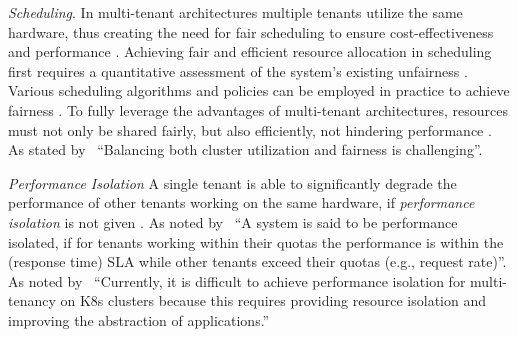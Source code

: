 \documentclass[11pt, a4paper, oneside, draft]{scrartcl}
\begin{document}
\begin{enumerate}[label={[\arabic*]:},
                    ref=Challenge~\arabic*,
                    leftmargin=*,
                    itemsep=0.6\baselineskip]
                    \item\label{chal:scheduling}
                        \textit{Scheduling}.
                        In multi-tenant architectures multiple tenants utilize the same hardware,
                        thus creating the need for fair scheduling to ensure cost-effectiveness
                        and performance \parencite[p.~32597]{simi2024}.
                        Achieving fair and efficient resource allocation in scheduling first
                        requires a quantitative assessment of the system's existing unfairness
                        \parencites[p.~7]{ebrahimi2012}[p.~14]{beltre2019}[pp.~2--3]{ghodsi2011}.
                        Various scheduling algorithms and policies can be employed in practice to
                        achieve fairness \parencites[pp.~14--16]{beltre2019}[p.~4]{ghodsi2011}.
                        To fully leverage the advantages of multi-tenant architectures, resources
                        must not only be shared fairly, but also efficiently, not hindering
                        performance \parencite[p.~14]{beltre2019}.
                        As stated by~\cite[p.~14]{beltre2019} \enquote{Balancing both cluster
                        utilization and fairness is challenging}.
                    
                    \item\label{chal:isolation}
                        \textit{Performance Isolation}
                        A single tenant is able to significantly degrade the performance of other
                        tenants working on the same hardware, if \textit{performance isolation}
                        is not given \parencite[p.~195]{krebs2013}.
                        As noted by~\cite[p.~195]{krebs2013} \enquote{A system is said to be
                        performance isolated, if for tenants working within their quotas the
                        performance is within the (response time) SLA while other tenants exceed
                        their quotas (e.g., request rate)}.
                        As noted by~\cite[p.~18]{carrion2022} \enquote{Currently, it is difficult
                        to achieve performance isolation for multi-tenancy on K8s clusters because
                        this requires providing resource isolation and improving the abstraction of
                        applications.}


\end{enumerate}
\end{document}
